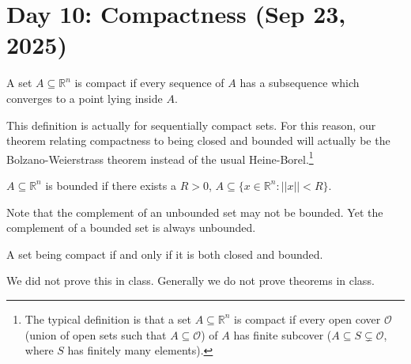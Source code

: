 \section{Day 10: Compactness (Sep 23, 2025)}

\begin{definition}[Compactness]
A set $A \subseteq \mathbb{R}^n$ is compact if every sequence of $A$ has a subsequence which converges to a point lying inside $A$. 
\end{definition}

This definition is actually for sequentially compact sets. For this reason, our theorem relating compactness to being closed and bounded will actually be the Bolzano-Weierstrass theorem instead of the usual Heine-Borel.\footnote{The typical definition is that a set $A \subseteq \mathbb{R}^n$ is compact if every open cover $\mathcal{O}$ (union of open sets such that $A \subseteq \mathcal{O}$) of $A$ has finite subcover ($A \subseteq S \subsetneq \mathcal{O}$, where $S$ has finitely many elements).}

\begin{definition}[Boundedness]
    $A \subseteq \mathbb{R}^n$ is bounded if there exists a $R > 0$, $A \subseteq \{ x \in \mathbb{R}^n : ||x|| < R \}$.
\end{definition}

Note that the complement of an unbounded set may not be bounded. Yet the complement of a bounded set is always unbounded.

\begin{theorem}
A set being compact if and only if it is both closed and bounded.
\end{theorem}

We did not prove this in class. Generally we do not prove theorems in class.
